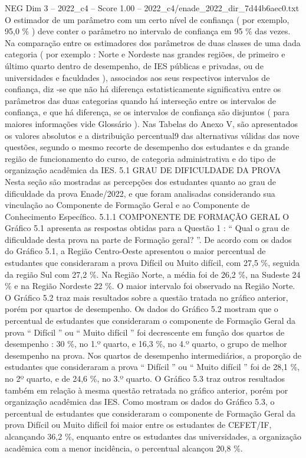 \begin{textsample}{NEG Dim 3 – 2022\_c4 – Score 1.00 – 2022\_c4/enade\_2022\_dir\_7d44b6aec0.txt}
O estimador de um parâmetro com um certo nível de confiança ( por exemplo, 95,0 \% ) deve conter o parâmetro no intervalo de confiança em 95 \% das vezes.
Na comparação entre os estimadores dos parâmetros de duas classes de uma dada categoria ( por exemplo : Norte e Nordeste nas grandes regiões, de primeiro e último quarto dentro de desempenho, de IES públicas e privadas, ou de universidades e faculdades ), associados aos seus respectivos intervalos de confiança, diz -se que não há diferença estatisticamente significativa entre os parâmetros das duas categorias quando há interseção entre os intervalos de confiança, e que há diferença, se os intervalos de confiança são disjuntos ( para maiores informações vide Glossário ).
Nas Tabelas do Anexo V, são apresentados os valores absolutos e a distribuição percentual9 das alternativas válidas das nove questões, segundo o mesmo recorte de desempenho dos estudantes e da grande região de funcionamento do curso, de categoria administrativa e do tipo de organização acadêmica da IES. 5.1 GRAU DE DIFICULDADE DA PROVA Nesta seção são mostradas as percepções dos estudantes quanto ao grau de dificuldade da prova Enade/2022, e que foram analisadas considerando sua vinculação ao Componente de Formação Geral e ao Componente de Conhecimento Específico. 5.1.1 COMPONENTE DE FORMAÇÃO GERAL O Gráfico 5.1 apresenta as respostas obtidas para a Questão 1 : “ Qual o grau de dificuldade desta prova na parte de Formação geral? ”.
De acordo com os dados do Gráfico 5.1, a Região Centro-Oeste apresentou o maior percentual de estudantes que consideraram a prova Difícil ou Muito difícil, com 27,5 \%, seguida da região Sul com 27,2 \%.
Na Região Norte, a média foi de 26,2 \%, na Sudeste 24 \% e na Região Nordeste 22 \%.
O maior intervalo foi observado na Região Norte.
O Gráfico 5.2 traz mais resultados sobre a questão tratada no gráfico anterior, porém por quartos de desempenho.
Os dados do Gráfico 5.2 mostram que o percentual de estudantes que consideraram o componente de Formação Geral da prova “ Difícil ” ou “ Muito difícil ” foi decrescente em função dos quartos de desempenho : 30 \%, no 1.º quarto, e 16,3 \%, no 4.º quarto, o grupo de melhor desempenho na prova.
Nos quartos de desempenho intermediários, a proporção de estudantes que consideraram a prova “ Difícil ” ou “ Muito difícil ” foi de 28,1 \%, no 2º quarto, e de 24,6 \%, no 3.º quarto.
O Gráfico 5.3 traz outros resultados também em relação à mesma questão retratada no gráfico anterior, porém por organização acadêmica das IES.
Como mostram os dados do Gráfico 5.3, o percentual de estudantes que consideraram o componente de Formação Geral da prova Difícil ou Muito difícil foi maior entre os estudantes de CEFET/IF, alcançando 36,2 \%, enquanto entre os estudantes das universidades, a organização acadêmica com a menor incidência, o percentual alcançou 20,8 \%.

\end{textsample}
